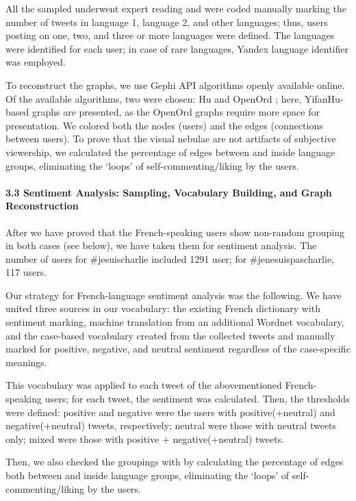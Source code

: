 All the sampled underwent expert reading and were coded manually marking the number of tweets in language 1, language 2, and other languages; thus, users posting on one, two, and three or more languages were defined. The languages were identified for each user; in case of rare languages, Yandex language identifier was employed.

To reconstruct the graphs, we use Gephi API algorithms openly available online. Of the available algorithms, two were chosen: Hu \cite{Hu} and OpenOrd \cite{MartinBrownKlavans}; here, YifanHu-based graphs are presented, as the OpenOrd graphs require more space for presentation. We colored both the nodes (users) and the edges (connections between users). To prove that the visual nebulae are not artifacts of subjective viewership, we calculated the percentage of edges between and inside language groups, eliminating the ‘loops’ of self-commenting/liking by the users.

\paragraph{3.3 Sentiment Analysis: Sampling, Vocabulary Building, and Graph Reconstruction}After we have proved that the French-speaking users show non-random grouping in both cases (see below), we have taken them for sentiment analysis. The number of users for \#jesuischarlie included 1291 user; for \#jenesuispascharlie, 117 users.

Our strategy for French-language sentiment analysis was the following. We have united three sources in our vocabulary: the existing French dictionary with sentiment marking, machine translation from an additional Wordnet vocabulary, and the case-based vocabulary created from the collected tweets and manually marked for positive, negative, and neutral sentiment regardless of the case-specific meanings.

This vocabulary was applied to each tweet of the abovementioned French-speaking users; for each tweet, the sentiment was calculated. Then, the thresholds were defined: positive and negative were the users with positive(+neutral) and negative(+neutral) tweets, respectively; neutral were those with neutral tweets only; mixed were those with positive + negative(+neutral) tweets.

Then, we also checked the groupings with by calculating the percentage of edges both between and inside language groups, eliminating the ‘loops’ of self-commenting/liking by the users.

